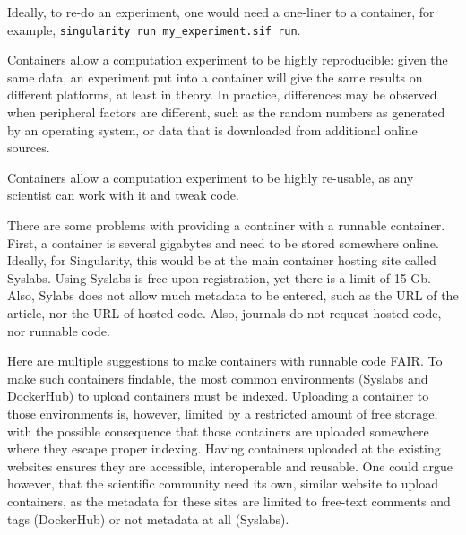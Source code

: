Ideally, to re-do an experiment, one would need a one-liner to a container,
for example, \verb|singularity run my_experiment.sif run|.


Containers allow a computation experiment to be highly reproducible:
given the same data, an experiment put into a container will give
the same results on different platforms, at least in theory.
In practice, differences may be observed when peripheral factors
are different, such as the random numbers as generated by an operating
system, or data that is downloaded from additional online sources.


Containers allow a computation experiment to be highly re-usable,
as any scientist can work with it and tweak code.


There are some problems with providing a container with a runnable container.
First, a container is several gigabytes and need to be stored somewhere
online. 
Ideally, for Singularity, this would be at the main container hosting
site called Syslabs. Using Syslabs is free upon registration, 
yet there is a limit of 15 Gb. Also, Sylabs does not allow much metadata to
be entered, such as the URL of the article, nor the URL of hosted code.
Also, journals do not request hosted code, nor runnable code.


Here are multiple suggestions to make containers with runnable code FAIR.
To make such containers findable, the most common 
environments (Syslabs and DockerHub) to upload containers must be indexed.
Uploading a container to those environments is, however, limited by
a restricted amount of free storage, with the possible consequence that
those containers are uploaded somewhere where they escape proper indexing.
Having containers uploaded at the existing websites ensures they are
accessible, interoperable and reusable.
One could argue however, that the scientific community need its own,
similar website to upload containers, as the metadata for these
sites are limited to free-text comments and tags (DockerHub)
or not metadata at all (Syslabs).

